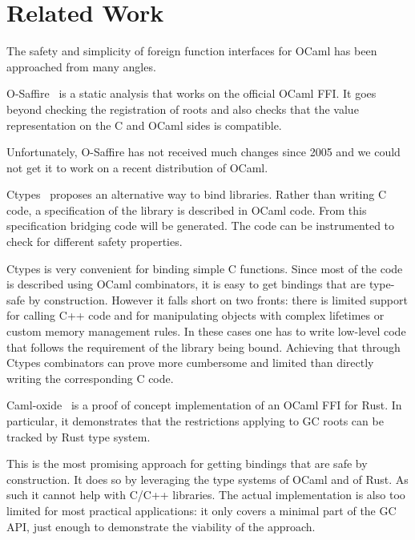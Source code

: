 \documentclass[a4paper]{easychair}
\newcommand{\cpp}[1]{\lstinline[style=C++]{#1}}
\begin{document}
\section{Related Work}

The safety and simplicity of foreign function interfaces for OCaml has been
approached from many angles.

O-Saffire~\citep{Furr:2005:CTS:1064978.1065019} is a static analysis that works
on the official OCaml FFI. It goes beyond checking the registration of roots
and also checks that the value representation on the C and OCaml sides is
compatible.

Unfortunately, O-Saffire has not received much changes since 2005 and we could
not get it to work on a recent distribution of OCaml.

Ctypes~\citep{DBLP:journals/scp/YallopSM18} proposes an alternative way to bind
libraries. Rather than writing C code, a specification of the library is
described in OCaml code. From this specification bridging code will be
generated. The code can be instrumented to check for different safety
properties.

Ctypes is very convenient for binding simple C functions. Since most of the
code is described using OCaml combinators, it is easy to get bindings that are
type-safe by construction.  However it falls short on two fronts:  there is
limited support for calling C++ code and for manipulating objects with complex
lifetimes or custom memory management rules.  In these cases one has to write
low-level code that follows the requirement of the library being bound.
Achieving that through Ctypes combinators can prove more cumbersome and limited
than directly writing the corresponding C code.

Caml-oxide~\citep{camloxide} is a proof of concept implementation of an OCaml
FFI for Rust. In particular, it demonstrates that the restrictions applying to
GC roots can be tracked by Rust type system.

This is the most promising approach for getting bindings that are safe by
construction. It does so by leveraging the type systems of OCaml and of Rust.
As such it cannot help with C/C++ libraries. The actual implementation is
also too limited for most practical applications: it only covers a minimal part
of the GC API, just enough to demonstrate the viability of the approach.

% 
% 

\label{sect:bib}

\end{document}
